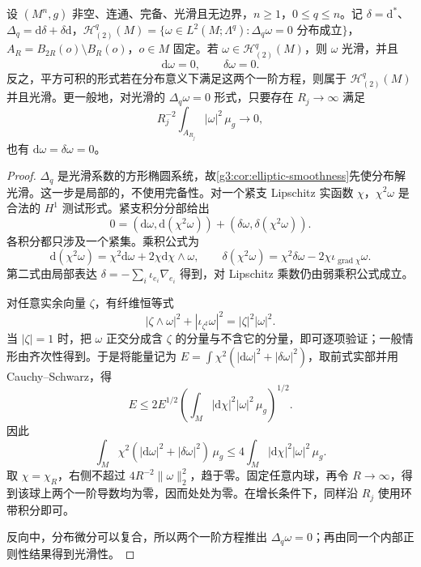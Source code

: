 \begin{theorem}\label{g3:thm:complete-l2-harmonic-forms}
	设 \((M^n,g)\) 非空、连通、完备、光滑且无边界，\(n\ge1\)，\(0\le q\le n\)。记 \(\delta=\mathrm d^*\)、\(\Delta_q=\mathrm d\delta+\delta\mathrm d\)，\(\mathcal H_{(2)}^q(M)=\{\omega\in L^2(M;\Lambda^q):\Delta_q\omega=0\text{ 分布成立}\}\)，\(A_R=B_{2R}(o)\setminus B_R(o)\)，\(o\in M\) 固定。若 \(\omega\in\mathcal H_{(2)}^q(M)\)，则 \(\omega\) 光滑，并且
	\[
		\mathrm d\omega=0,\qquad\delta\omega=0.
	\]
	反之，平方可积的形式若在分布意义下满足这两个一阶方程，则属于 \(\mathcal H_{(2)}^q(M)\) 并且光滑。更一般地，对光滑的 \(\Delta_q\omega=0\) 形式，只要存在 \(R_j\to\infty\) 满足
	\begin{equation}\label{g3:eq:harmonic-form-annular-growth}
		R_j^{-2}\int_{A_{R_j}}|\omega|^2\,\mu_g\longrightarrow0,
	\end{equation}
	也有 \(\mathrm d\omega=\delta\omega=0\)。
\end{theorem}
\begin{proof}
	\(\Delta_q\) 是光滑系数的方形椭圆系统，故\cref{g3:cor:elliptic-smoothness}先使分布解光滑。这一步是局部的，不使用完备性。对一个紧支 Lipschitz 实函数 \(\chi\)，\(\chi^2\omega\) 是合法的 \(H^1\) 测试形式。紧支积分分部给出
	\[
		0=(\mathrm d\omega,\mathrm d(\chi^2\omega))
		+(\delta\omega,\delta(\chi^2\omega)).
	\]
	各积分都只涉及一个紧集。乘积公式为
	\[
		\mathrm d(\chi^2\omega)=\chi^2\mathrm d\omega
		+2\chi\mathrm d\chi\wedge\omega,\qquad
		\delta(\chi^2\omega)=\chi^2\delta\omega
		-2\chi\iota_{\operatorname{grad}\chi}\omega.
	\]
	第二式由局部表达 \(\delta=-\sum_i\iota_{e_i}\nabla_{e_i}\) 得到，对 Lipschitz 乘数仍由弱乘积公式成立。

	对任意实余向量 \(\zeta\)，有纤维恒等式
	\[
		|\zeta\wedge\omega|^2+|\iota_{\zeta^\sharp}\omega|^2
		=|\zeta|^2|\omega|^2.
	\]
	当 \(|\zeta|=1\) 时，把 \(\omega\) 正交分成含 \(\zeta\) 的分量与不含它的分量，即可逐项验证；一般情形由齐次性得到。于是将能量记为
	\(E=\int\chi^2(|\mathrm d\omega|^2+|\delta\omega|^2)\)，取前式实部并用 Cauchy--Schwarz，得
	\[
		E\le2E^{1/2}
		\left(\int_M|\mathrm d\chi|^2|\omega|^2\,\mu_g\right)^{1/2}.
	\]
	因此
	\begin{equation}\label{g3:eq:harmonic-form-cutoff-energy}
		\int_M\chi^2(|\mathrm d\omega|^2+|\delta\omega|^2)\,\mu_g
		\le4\int_M|\mathrm d\chi|^2|\omega|^2\,\mu_g.
	\end{equation}
	取 \(\chi=\chi_R\)，右侧不超过 \(4R^{-2}\|\omega\|_2^2\)，趋于零。固定任意内球，再令 \(R\to\infty\)，得到该球上两个一阶导数均为零，因而处处为零。在增长条件下，同样沿 \(R_j\) 使用环带积分即可。

	反向中，分布微分可以复合，所以两个一阶方程推出 \(\Delta_q\omega=0\)；再由同一个内部正则性结果得到光滑性。
\end{proof}

